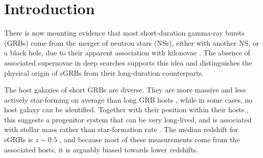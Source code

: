 \documentclass{aa}    %
\begin{document}
\section{Introduction}


There is now mounting evidence that most short-duration gamma-ray bursts (GRBs)
come from the merger of neutron stars (NSs), either with another NS, or a black
hole, due to their apparent association with kilonovae \citep{Barnes2013a,
	Tanvir2013b, Yang2015, Jin2016, Rosswog2016}. The absence of associated
supernovae in deep searches \citep[e.g.][]{Hjorth2005a,Fox2005,Hjorth2005b}
supports this idea and distinguishes the physical origin of sGRBs from their
long-duration counterparts. %


The host galaxies of short GRBs are diverse. They are more massive and less actively 
star-forming on average than long GRB hosts \citep{Fong2013b}, while in some cases, no host 
galaxy can be identified. Together with their position 
within their hosts \citep{Fong2013a}, this suggests a progenitor system that can be very
long-lived, and is associated with stellar mass rather than star-formation rate
\citep{Berger2014}. The median redshift for sGRBs is $z\sim0.5$ \citep{Berger2014}, and
because most of these measurements come from the associated hosts, it is arguably biased
towards lower redshifts.


\end{document}
